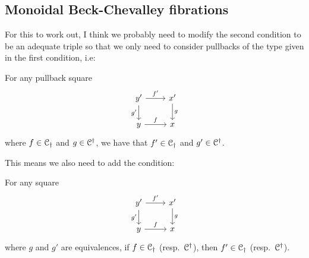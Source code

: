 \documentclass[main.tex]{subfiles}
\begin{document}
\subsection{Monoidal Beck-Chevalley fibrations}
\label{ssc:monoidal_beck_chevalley_fibrations}

\begin{note}
  For this to work out, I think we probably need to modify the second condition to be an adequate triple so that we only need to consider pullbacks of the type given in the first condition, i.e:

  For any pullback square
  \begin{equation*}
    \begin{tikzcd}
      y'
      \arrow[r,  "f'"]
      \arrow[d, swap, "g'"]
      & x'
      \arrow[d, "g"]
      \\
      y
      \arrow[r, "f"]
      & x
    \end{tikzcd}
  \end{equation*}
  where $f \in \mathcal{C}_{\dagger}$ and $g \in \mathcal{C}^{\dagger}$, we have that $f' \in \mathcal{C}_{\dagger}$ and $g' \in \mathcal{C}^{\dagger}$.

  This means we also need to add the condition:

  For any square
  \begin{equation*}
    \begin{tikzcd}
      y'
      \arrow[r,  "f'"]
      \arrow[d, swap, "g'"]
      & x'
      \arrow[d, "g"]
      \\
      y
      \arrow[r, "f"]
      & x
    \end{tikzcd}
  \end{equation*}
  where $g$ and $g'$ are equivalences, if $f \in \mathcal{C}_{\dagger}$  (resp.\ $\mathcal{C}^{\dagger}$), then $f' \in \mathcal{C}_{\dagger}$ (resp.\ $\mathcal{C}^{\dagger}$).
\end{note}
\end{document}
